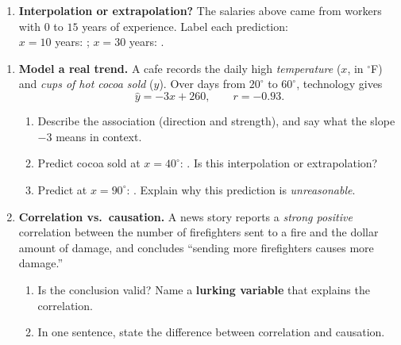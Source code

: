 \documentclass[10pt]{article}
\begin{document}
\begin{tcolorbox}[colback=white, colframe=black!40, title=\textbf{Tier A --- Approaching Proficiency},
    fonttitle=\bfseries, arc=1.5mm, left=3mm, right=3mm, top=2mm, bottom=2mm, breakable]
\begin{enumerate}[leftmargin=1.7em, itemsep=10pt]
\begin{enumerate}[label=(\alph*), leftmargin=1.8em, itemsep=4pt]
\begin{work}
                         &= 25 + 38      \\
                         &= 63
                \end{work}
                That is \$\blank{1.6cm}.
        \end{enumerate}
  \item \textbf{Interpolation or extrapolation?} The salaries above came from workers with $0$ to $15$ years
        of experience. Label each prediction:
        \\[3pt]
        $x=10$ years: \blank{2.6cm}; \qquad $x=30$ years: \blank{2.6cm}.
\end{enumerate}
\end{tcolorbox}

\begin{tcolorbox}[colback=white, colframe=black!40, title=\textbf{Tier E --- Extension},
    fonttitle=\bfseries, arc=1.5mm, left=3mm, right=3mm, top=2mm, bottom=2mm, breakable]
\begin{enumerate}[leftmargin=1.7em, itemsep=10pt]
  \item \textbf{Model a real trend.} A cafe records the daily high \emph{temperature} ($x$, in $^\circ$F)
        and \emph{cups of hot cocoa sold} ($y$). Over days from $20^\circ$ to $60^\circ$, technology gives
        \[ \hat y=-3x+260, \qquad r=-0.93. \]
        \begin{enumerate}[label=(\alph*), leftmargin=1.8em, itemsep=5pt]
          \item Describe the association (direction and strength), and say what the slope $-3$ means in
                context. 
          \item Predict cocoa sold at $x=40^\circ$: \blank{1.8cm}. Is this interpolation or extrapolation?
                \blank{2.4cm}
          \item Predict at $x=90^\circ$: \blank{1.8cm}. Explain why this prediction is \emph{unreasonable}.
        \end{enumerate}
  \item \textbf{Correlation vs.\ causation.} A news story reports a \emph{strong positive} correlation
        between the number of firefighters sent to a fire and the dollar amount of damage, and concludes
        ``sending more firefighters causes more damage.''
        \begin{enumerate}[label=(\alph*), leftmargin=1.8em, itemsep=5pt]
          \item Is the conclusion valid? \blank{1.4cm} \; Name a \textbf{lurking variable} that explains the
                correlation. 
          \item In one sentence, state the difference between correlation and causation. 
        \end{enumerate}
\end{enumerate}
\end{tcolorbox}
\end{document}
